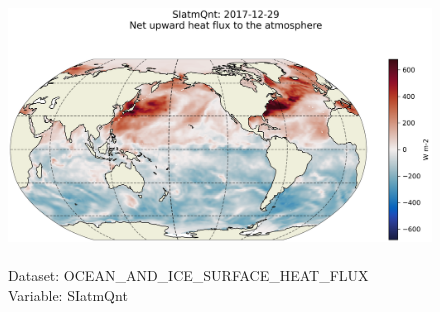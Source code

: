 \begin{figure}[H]
\centering
\includegraphics[scale=0.5]{../images/plots/latlon_plots/Ocean_and_Sea-Ice_Surface_Heat_Fluxes/SIatmQnt.png}
\caption{\\Dataset: OCEAN\_AND\_ICE\_SURFACE\_HEAT\_FLUX\\Variable: SIatmQnt}
\label{tab:table-OCEAN_AND_ICE_SURFACE_HEAT_FLUX_SIatmQnt-Plot}
\end{figure}
\pagebreak
